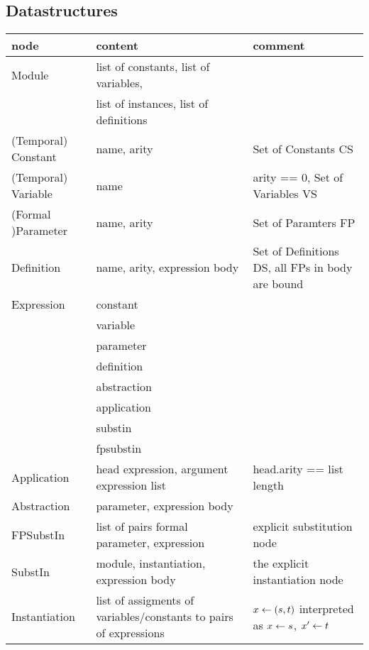 \documentclass[a4paper]{article}
\theoremstyle{definition}
\begin{document}
\subsection{Datastructures}
\label{sec:ds}

\begin{tabular}{lp{}p{}}
  node & content & comment \\
  \hline
  Module & list of constants, list of variables, & \\
       & list of instances, list of definitions & \\
  (Temporal) Constant  & name, arity & Set of Constants CS \\
  (Temporal) Variable  & name & arity == 0, Set of Variables VS \\
  (Formal )Parameter & name, arity & Set of Paramters FP \\
  Definition & name, arity, expression body & Set of Definitions DS,
                                              all FPs in body are bound \\
  Expression  & constant    & \\
       & \dor{} variable    & \\
       & \dor{} parameter   & \\
       & \dor{} definition  & \\
       & \dor{} abstraction & \\
       & \dor{} application & \\
       & \dor{} substin     & \\
       & \dor{} fpsubstin   & \\
  Application & head expression, argument expression list
                 & head.arity == list length\\
  Abstraction & parameter, expression body & \\
  FPSubstIn  & list of pairs formal parameter, expression
                 & explicit substitution node \\
  SubstIn     & module, instantiation, expression body
                 & the explicit instantiation node \\
  Instantiation & list of assigments of variables/constants to pairs
                  of expressions & $x \leftarrow (s,t)$ interpreted as $x \leftarrow s$,
                                   $x' \leftarrow t$ \\
\end{tabular}
\end{document}
